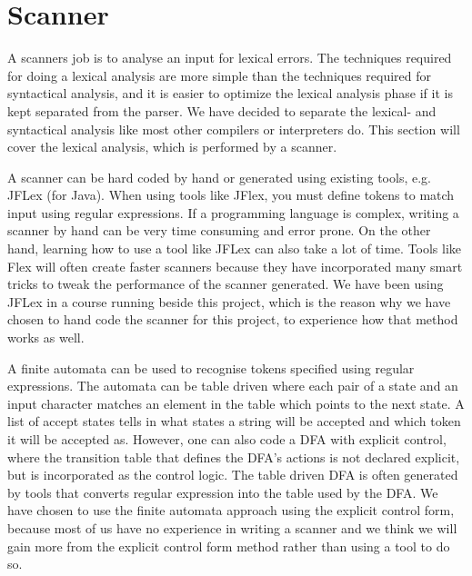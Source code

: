 \section{Scanner}
A scanners job is to analyse an input for lexical errors. The techniques required for doing a lexical analysis are more simple than the techniques required for syntactical analysis, and it is easier to optimize the lexical analysis phase if it is kept separated from the parser. We have decided to separate the lexical- and syntactical analysis like most other compilers or interpreters do. This section will cover the lexical analysis, which is performed by a scanner. %

A scanner can be hard coded by hand or generated using existing tools, e.g. JFLex (for Java). When using tools like JFlex, you must define tokens to match input using regular expressions. If a programming language is complex, writing a scanner by hand can be very time consuming and error prone. On the other hand, learning how to use a tool like JFLex can also take a lot of time. Tools like Flex will often create faster scanners because they have incorporated many smart tricks to tweak the performance of the scanner generated.
 We have been using JFLex in a course running beside this project, which is the reason why we have chosen to hand code the scanner for this project, to experience how that method works as well.
 
A finite automata can be used to recognise tokens specified using regular expressions. The automata can be table driven where each pair of a state and an input character matches an element in the table which points to the next state. A list of accept states tells in what states a string will be accepted and which token it will be accepted as. However, one can also code a DFA with explicit control, where the transition table that defines the DFA's actions is not declared explicit, but is incorporated as the control logic. The table driven DFA is often generated by tools that converts regular expression into the table used by the DFA. We have chosen to use the finite automata approach using the explicit control form, because most of us have no experience in writing a scanner and we think we will gain more from the explicit control form method rather than using a tool to do so.

